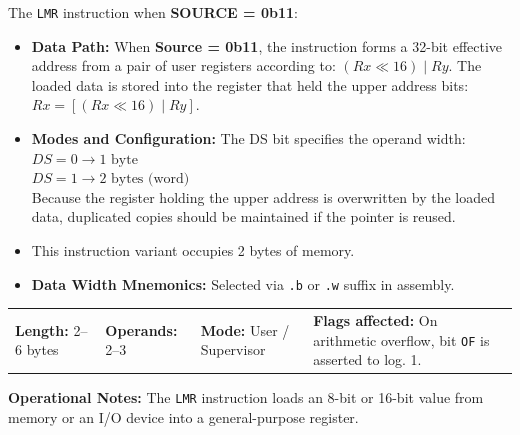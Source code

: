\documentclass[11pt,a4paper]{article}
\newcommand{\reg}{\$}
\newcommand{\regPTREG}{\$PTREG}
\begin{document}
\begin{instructiondesc}[title={Register Pair Indirect Load Mode}]
The \texttt{LMR} instruction when \textbf{SOURCE = 0b11}:
\begin{itemize}
    \item \textbf{Data Path:} When \textbf{Source = 0b11}, the instruction forms a 32-bit effective address from a pair of user registers according to: \( (Rx \ll 16) \mid Ry \). The loaded data is stored into the register that held the upper address bits: \( Rx = [(Rx \ll 16) \mid Ry] \).
    \item \textbf{Modes and Configuration:} The DS bit specifies the operand width: \\
    \( DS = 0 \rightarrow 1\text{ byte} \) \\
    \( DS = 1 \rightarrow 2\text{ bytes (word)} \) \\
    Because the register holding the upper address is overwritten by the loaded data, duplicated copies should be maintained if the pointer is reused.
    \item This instruction variant occupies 2 bytes of memory.
    \item \textbf{Data Width Mnemonics:} Selected via \texttt{.b} or \texttt{.w} suffix in assembly.
\end{itemize}
\end{instructiondesc}

\begin{tcolorbox}[
    enhanced,
    colback=limcard,
    colframe=limborder,
    boxrule=0.6pt,
    arc=3pt,
    left=8pt,right=8pt,top=6pt,bottom=6pt
]
    \footnotesize
    \noindent
    \begin{tabularx}{\textwidth}{@{}l l l X@{}}
        \textbf{Length:} 2--6 bytes &
        \textbf{Operands:} 2--3 &
        \textbf{Mode:} User / Supervisor &
        \textbf{Flags affected:} On arithmetic overflow, bit \texttt{OF} is asserted to log. 1.
    \end{tabularx}
\end{tcolorbox}

\begin{examplebox}[title={Usage Example (LIM2 Assembly)}]
\vspace{1.5mm}
\footnotesize\color{limmuted}
\textbf{Operational Notes:} The \texttt{LMR} instruction loads an 8-bit or 16-bit value from memory or an I/O device into a general-purpose register.
\end{examplebox}
\end{document}
